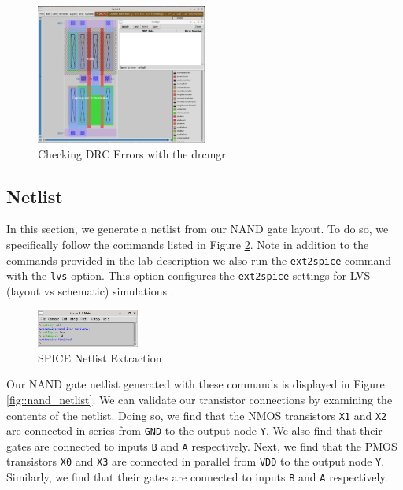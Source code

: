 \documentclass{article}
\begin{document}
	\begin{figure}[H]
		\centerline{\includegraphics[width=0.5\textwidth]{nand_drc_errors_drcmgr.png}}
		\caption{Checking DRC Errors with the drcmgr}
		\label{fig::nand_drc_errors_drcmgr}
	\end{figure}
	
	\subsection{Netlist}
	
	In this section, we generate a netlist from our NAND gate layout. To do so, we specifically follow the commands listed in Figure \ref{fig::nand_netlist_creation}. Note in addition to the commands provided in the lab description we also run the \texttt{ext2spice} command with the \texttt{lvs} option. This option configures the \texttt{ext2spice} settings for LVS (layout vs schematic) simulations \cite{a2021_magic83}.
	
	\begin{figure}[H]
		\centerline{\includegraphics[width=0.3\textwidth]{nand_netlist_creation.png}}
		\caption{SPICE Netlist Extraction}
		\label{fig::nand_netlist_creation}
	\end{figure}
	
	Our NAND gate netlist generated with these commands is displayed in Figure \ref{fig::nand_netlist}. We can validate our transistor connections by examining the contents of the netlist. Doing so, we find that the NMOS transistors \texttt{X1} and \texttt{X2} are connected in series from \texttt{GND} to the output node \texttt{Y}. We also find that their gates are connected to inputs \texttt{B} and \texttt{A} respectively. Next, we find that the PMOS transistors \texttt{X0} and \texttt{X3} are connected in parallel from \texttt{VDD} to the output node \texttt{Y}. Similarly, we find that their gates are connected to inputs \texttt{B} and \texttt{A} respectively.
	
\end{document}
